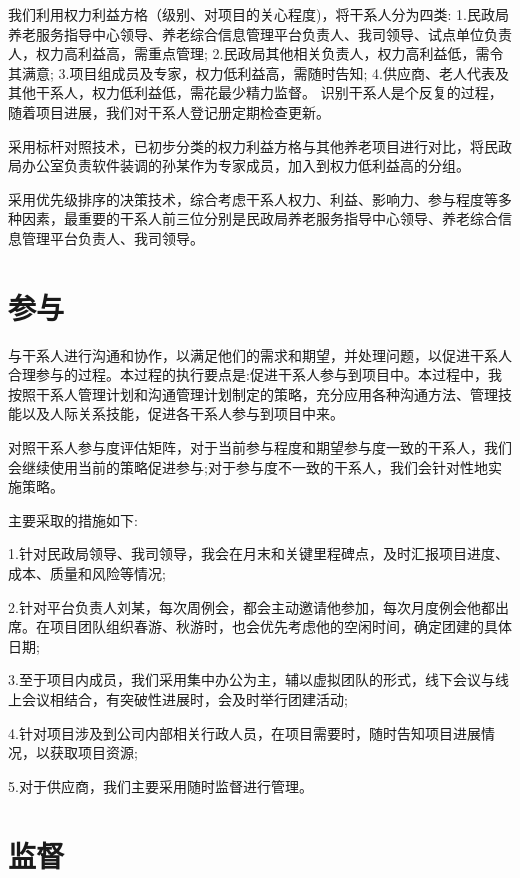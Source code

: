 \documentclass[UTF8]{../computerUniverse}
\begin{document}
我们利用权力利益方格（级别、对项目的关心程度)，将干系人分为四类:
1.民政局养老服务指导中心领导、养老综合信息管理平台负责人、我司领导、试点单位负责人，权力高利益高，需重点管理;
2.民政局其他相关负责人，权力高利益低，需令其满意;
3.项目组成员及专家，权力低利益高，需随时告知;
4.供应商、老人代表及其他干系人，权力低利益低，需花最少精力监督。
识别干系人是个反复的过程，随着项目进展，我们对干系人登记册定期检查更新。

采用标杆对照技术，已初步分类的权力利益方格与其他养老项目进行对比，将民政局办公室负责软件装调的孙某作为专家成员，加入到权力低利益高的分组。

采用优先级排序的决策技术，综合考虑干系人权力、利益、影响力、参与程度等多种因素，最重要的干系人前三位分别是民政局养老服务指导中心领导、养老综合信息管理平台负责人、我司领导。


\section{参与}




与干系人进行沟通和协作，以满足他们的需求和期望，并处理问题，以促进干系人合理参与的过程。本过程的执行要点是:促进干系人参与到项目中。本过程中，我按照干系人管理计划和沟通管理计划制定的策略，充分应用各种沟通方法、管理技能以及人际关系技能，促进各干系人参与到项目中来。

对照干系人参与度评估矩阵，对于当前参与程度和期望参与度一致的干系人，我们会继续使用当前的策略促进参与;对于参与度不一致的干系人，我们会针对性地实施策略。

主要采取的措施如下:

1.针对民政局领导、我司领导，我会在月末和关键里程碑点，及时汇报项目进度、成本、质量和风险等情况;

2.针对平台负责人刘某，每次周例会，都会主动邀请他参加，每次月度例会他都出席。在项目团队组织春游、秋游时，也会优先考虑他的空闲时间，确定团建的具体日期;

3.至于项目内成员，我们采用集中办公为主，辅以虚拟团队的形式，线下会议与线上会议相结合，有突破性进展时，会及时举行团建活动;

4.针对项目涉及到公司内部相关行政人员，在项目需要时，随时告知项目进展情况，以获取项目资源;

5.对于供应商，我们主要采用随时监督进行管理。




\section{监督}
\end{document}
